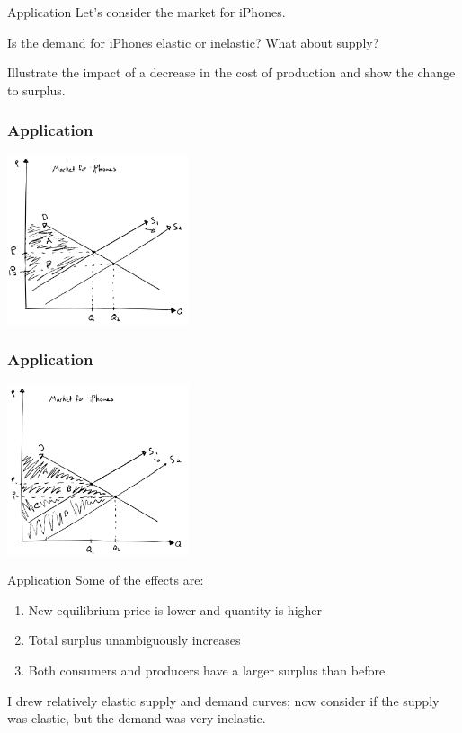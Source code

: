 \documentclass[aspectratio=169]{beamer}
\begin{document}
\begin{frame}{Application}
    Let's consider the market for iPhones.

    \vspace{2mm}

    Is the demand for iPhones elastic or inelastic? What about supply?

    \vspace{2mm}

    Illustrate the impact of a decrease in the cost of production and show the change to surplus.
\end{frame}

\begin{frame}
    \frametitle{Application}
    \centering
    \includegraphics[width = 0.4\textwidth,keepaspectratio]{../figs/iphone1.png}
\end{frame}

\begin{frame}
    \frametitle{Application}
    \centering
    \includegraphics[width = 0.4\textwidth,keepaspectratio]{../figs/iphone2.png}
\end{frame}

\begin{frame}{Application}
    Some of the effects are:
    \begin{enumerate}
        \item New equilibrium price is lower and quantity is higher
        \item Total surplus unambiguously increases
        \item Both consumers and producers have a larger surplus than before
    \end{enumerate}
    
    I drew relatively elastic supply and demand curves; now consider if the supply was elastic, but the demand was very inelastic.
\end{frame}
\end{document}
